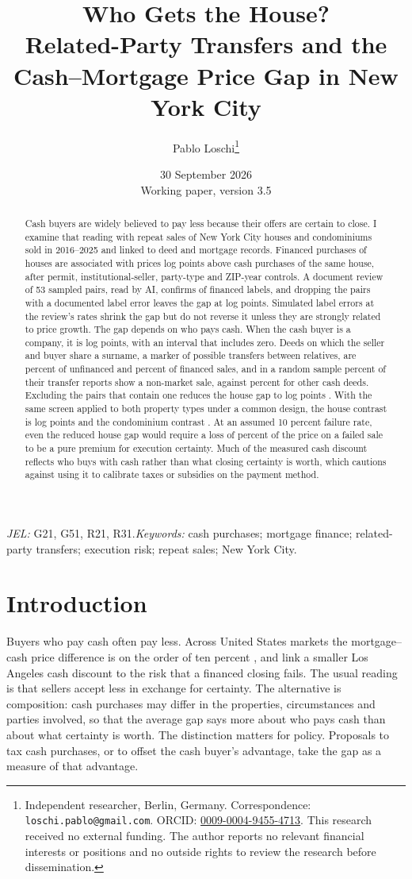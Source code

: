 \documentclass[12pt]{article}
\title{\bfseries Who Gets the House?\\[2mm]\large Related-Party Transfers and the Cash--Mortgage Price Gap in New York City}
\author{Pablo Loschi\thanks{Independent researcher, Berlin, Germany. Correspondence: \texttt{loschi.pablo@gmail.com}. ORCID: \href{https://orcid.org/0009-0004-9455-4713}{0009-0004-9455-4713}. This research received no external funding. The author reports no relevant financial interests or positions and no outside rights to review the research before dissemination.}}
\date{30 September 2026\\\small Working paper, version 3.5}
\begin{document}
\maketitle
\begin{abstract}\singlespacing\noindent
Cash buyers are widely believed to pay less because their offers are certain to close. I examine that reading with repeat sales of New York City houses and condominiums sold in 2016--2025 and linked to deed and mortgage records. Financed purchases of houses are associated with prices \HouseGap{} log points above cash purchases of the same house, after permit, institutional-seller, party-type and ZIP-year controls. A document review of 53 sampled pairs, read by AI, confirms \ReviewFinConfirmed{} of \ReviewFinTotal{} financed labels, and dropping the \ReviewErrPairs{} pairs with a documented label error leaves the gap at \ReviewCorrected{} log points. Simulated label errors at the review's rates shrink the gap but do not reverse it unless they are strongly related to price growth. The gap depends on who pays cash. When the cash buyer is a company, it is \CompanyCash{} log points, with an interval that includes zero. Deeds on which the seller and buyer share a surname, a marker of possible transfers between relatives, are \RelShareCash{} percent of unfinanced and \RelShareFin{} percent of financed sales, and in a random sample \DeedShare{} percent of their transfer reports show a non-market sale, against \DeedUShare{} percent for other cash deeds. Excluding the \RelPairs{} pairs that contain one reduces the house gap to \NoRelOLS{} log points \NoRelOLSCI{}. With the same screen applied to both property types under a common design, the house contrast is \HouseBQNoRel{} log points and the condominium contrast \CondoNoRel{}. At an assumed 10 percent failure rate, even the reduced house gap would require a loss of \NoRelInvQTen{} percent of the price on a failed sale to be a pure premium for execution certainty. Much of the measured cash discount reflects who buys with cash rather than what closing certainty is worth, which cautions against using it to calibrate taxes or subsidies on the payment method.
\end{abstract}
\noindent\textit{JEL:} G21, G51, R21, R31.\quad\textit{Keywords:} cash purchases; mortgage finance; related-party transfers; execution risk; repeat sales; New York City.
\newpage

\section{Introduction}
Buyers who pay cash often pay less. Across United States markets the mortgage--cash price difference is on the order of ten percent \citep{reher2024}, and \citet{hanhong2024} link a smaller Los Angeles cash discount to the risk that a financed closing fails. The usual reading is that sellers accept less in exchange for certainty. The alternative is composition: cash purchases may differ in the properties, circumstances and parties involved, so that the average gap says more about who pays cash than about what certainty is worth. The distinction matters for policy. Proposals to tax cash purchases, or to offset the cash buyer's advantage, take the gap as a measure of that advantage.
\end{document}
